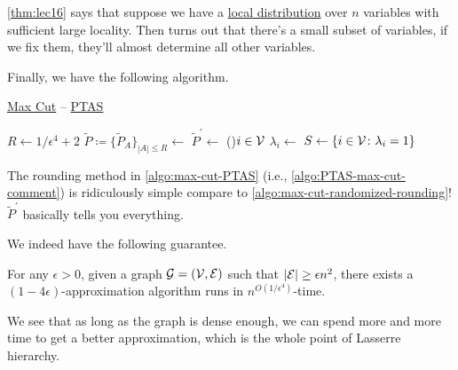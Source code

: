 \begin{remark}
	\autoref{thm:lec16} says that suppose we have a \hyperref[def:local-distribution]{local distribution} over \(n\) variables with sufficient large locality. Then turns out that there's a small subset of variables, if we fix them, they'll almost determine all other variables.
\end{remark}

Finally, we have the following algorithm.

\begin{algorithm}[H]\label{algo:max-cut-PTAS}
	\DontPrintSemicolon
	\caption{\hyperref[prb:max-cut]{Max Cut} -- \href{https://en.wikipedia.org/wiki/Polynomial-time_approximation_scheme}{PTAS}}
	\BlankLine
	\(R\gets 1 / \epsilon ^4 + 2\)\;
	\(\widetilde{P} \coloneqq \{ \widetilde{P} _A \}_{\left\vert A \right\vert \leq R} \gets\)\;
	\(\widetilde{P} ^\prime \gets\)
	\;
	\label{algo:PTAS-max-cut-comment}
	\For(){\(i\in \mathcal{\MakeUppercase{v}} \)}{
		\(\lambda _i\gets\)\;
	}
	\(S\gets \left\{ i\in \mathcal{\MakeUppercase{v}} \colon \lambda _i = 1 \right\} \)\;
	\;
\end{algorithm}

\begin{remark}
	The rounding method in \autoref{algo:max-cut-PTAS} (i.e., \autoref{algo:PTAS-max-cut-comment}) is ridiculously simple compare to \autoref{algo:max-cut-randomized-rounding}! \(\widetilde{P} ^\prime \) basically tells you everything.
\end{remark}

We indeed have the following guarantee.

\begin{theorem}\label{thm:PTAS-for-max-cut}
	For any \(\epsilon >0\), given a graph \(\mathcal{\MakeUppercase{g}} =(\mathcal{\MakeUppercase{v}} , \mathcal{\MakeUppercase{e}} )\) such that \(\left\vert \mathcal{\MakeUppercase{e}}  \right\vert \geq \epsilon n^{2} \), there exists a \((1 - 4\epsilon )\)-approximation algorithm runs in \(n^{O(1 / \epsilon ^4)}\)-time.
\end{theorem}

We see that as long as the graph is dense enough, we can spend more and more time to get a better approximation, which is the whole point of Lasserre hierarchy.
